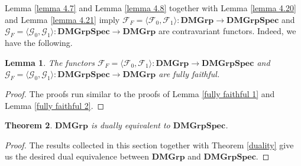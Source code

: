 \documentclass{amsart}
\theoremstyle{plain}
\newtheorem{theorem}{Theorem}[section]
\newtheorem{lemma}[theorem]{Lemma}
\theoremstyle{definition}
\begin{document}
Lemma \ref{lemma 4.7} and Lemma \ref{lemma 4.8} together with Lemma \ref{lemma 4.20} and Lemma \ref{lemma 4.21} imply $\mathcal{F}_F=\langle\mathcal{F}_0,\mathcal{F}_1\rangle\colon\mathbf{DMGrp}\to\mathbf{DMGrpSpec}$ and $\mathcal{G}_F=\langle\mathcal{G}_0,\mathcal{G}_1\rangle\colon\mathbf{DMGrpSpec}\to\mathbf{DMGrp}$ are contravariant functors. Indeed, we have the following.  
\begin{lemma}
    The functors $\mathcal{F}_F=\langle\mathcal{F}_0,\mathcal{F}_1\rangle\colon\mathbf{DMGrp}\to\mathbf{DMGrpSpec}$ and $\mathcal{G}_F=\langle\mathcal{G}_0,\mathcal{G}_1\rangle\colon\mathbf{DMGrpSpec}\to\mathbf{DMGrp}$ are fully faithful. 
\end{lemma}
\begin{proof}
    The proofs run similar to the proofs of Lemma \ref{fully faithful 1} and Lemma \ref{fully faithful 2}.  
\end{proof}

\begin{theorem}\label{duality 2}
    $\mathbf{DMGrp}$ is dually equivalent to $\mathbf{DMGrpSpec}$. 
\end{theorem}
\begin{proof}
    The results collected in this section together with Theorem \ref{duality} give us the desired dual equivalence between $\mathbf{DMGrp}$ and $\mathbf{DMGrpSpec}$. 
\end{proof}
\end{document}
